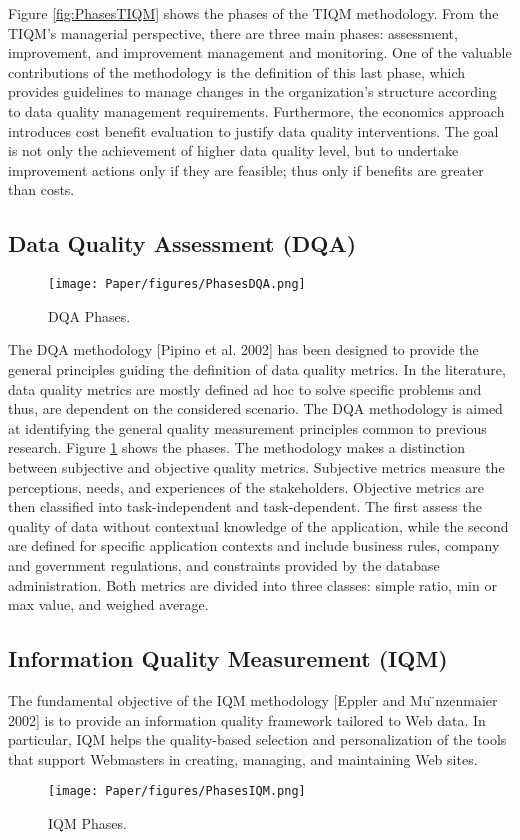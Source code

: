 \documentclass[pdftex,english,oribibl]{llncs}
\begin{document}
Figure \ref{fig:PhasesTIQM} shows the phases of the TIQM methodology.
From the TIQM's managerial perspective, there are three main phases: assessment, improvement, and improvement management and monitoring.
One of the valuable contributions of the methodology is the definition of this last phase, which provides guidelines to manage changes in the organization’s structure according to data quality management requirements.
Furthermore, the economics approach introduces cost benefit evaluation to justify data quality interventions.
The goal is not only the achievement of higher data quality level, but to undertake improvement actions only if they are feasible; thus only if benefits are greater than costs.

\subsection{Data Quality Assessment (DQA)}
\begin{figure}
    \centering
    \texttt{[image: Paper/figures/PhasesDQA.png]}
    \caption{DQA Phases.}
    \label{fig:PhasesDQA}
 \end{figure}

The DQA methodology [Pipino et al. 2002] has been designed to provide the general principles guiding the definition of data quality metrics. In the literature, data quality metrics are mostly defined ad hoc to solve specific problems and thus, are dependent on the considered scenario. The DQA methodology is aimed at identifying the general quality measurement principles common to previous research. Figure \ref{fig:PhasesDQA} shows the phases.
The methodology makes a distinction between subjective and objective quality metrics. Subjective metrics measure the perceptions, needs, and experiences of the stakeholders. Objective metrics are then classified into task-independent and task-dependent. The first assess the quality of data without contextual knowledge of the application, while the second are defined for specific application contexts and include business rules, company and government regulations, and constraints provided by the database administration. Both metrics are divided into three classes: simple ratio, min or max value, and weighed average.


\subsection{Information Quality Measurement (IQM)}
The fundamental objective of the IQM methodology [Eppler and Mu ̈nzenmaier 2002] is to provide an information quality framework tailored to Web data.
In particular, IQM helps the quality-based selection and personalization of the tools that support Webmasters in creating, managing, and maintaining Web sites.
\begin{figure}
    \centering
    \texttt{[image: Paper/figures/PhasesIQM.png]}
    \caption{IQM Phases.}
    \label{fig:PhasesIQM}
 \end{figure}
\end{document}
